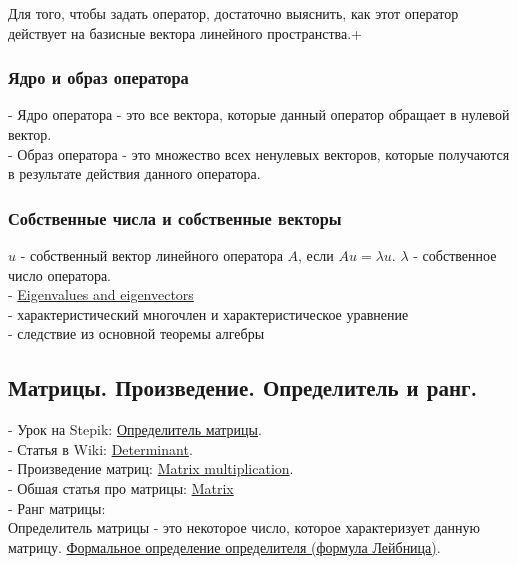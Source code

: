 \documentclass{article}
\begin{document}
Для того, чтобы задать оператор, достаточно выяснить, как этот оператор действует на базисные вектора линейного пространства.+

\subsubsection{Ядро и образ оператора}

- Ядро оператора - это все вектора, которые данный оператор обращает в нулевой вектор. \\
- Образ оператора - это множество всех ненулевых векторов, которые получаются в результате действия данного оператора. \\

\subsubsection{Собственные числа и собственные векторы}

$u$ - собственный вектор линейного оператора $A$, если $Au = \lambda u$. $\lambda$ - собственное число оператора. \\

- \href{https://en.wikipedia.org/wiki/Eigenvalues_and_eigenvectors}{Eigenvalues and eigenvectors} \\
- характеристический многочлен и характеристическое уравнение \\
- следствие из основной теоремы алгебры

\subsection{Матрицы. Произведение. Определитель и ранг.}

- Урок на Stepik: \href{https://stepik.org/lesson/44077/step/1?unit=21901}{Определитель матрицы}. \\
- Статья в Wiki: \href{https://en.wikipedia.org/wiki/Determinant}{Determinant}. \\
- Произведение матриц: \href{https://en.wikipedia.org/wiki/Matrix_multiplication}{Matrix multiplication}. \\
- Обшая статья про матрицы: \href{https://en.wikipedia.org/wiki/Matrix_(mathematics)}{Matrix} \\
- Ранг матрицы: \href{https://en.wikipedia.org/wiki/Rank_(linear_algebra)}{} \\

Определитель матрицы - это некоторое число, которое характеризует данную матрицу. \href{https://en.wikipedia.org/wiki/Leibniz_formula_for_determinants}{Формальное определение определителя (формула Лейбница)}.
\end{document}
